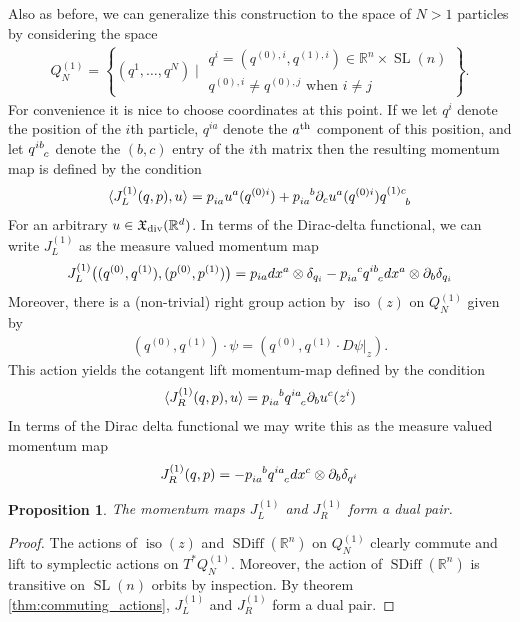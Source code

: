 \documentclass[12pt]{amsart}
\newcommand{\R}{\ensuremath{\mathbb{R}}}
\newtheorem{prop}[thm]{Proposition}
\DeclareMathOperator{\SDiff}{SDiff}
\DeclareMathOperator{\SL}{SL}
\DeclareMathOperator{\iso}{iso}
\begin{document}
  Also as before, we can generalize this construction to the space of
  $N > 1$ particles by considering the space
  \begin{align*}
    Q^{(1)}_N = \left\{  ( q^1 , \dots, q^N ) \mid
      \begin{array}{c}
        q^i = (q^{(0),i},q^{(1),i}) \in \R^n \times \SL(n) \\
        q^{(0),i} \neq q^{(0),j} \text{ when } i \neq j
      \end{array} \right\}.
  \end{align*}
  For convenience it is nice to choose coordinates at this point.
  If we let $q^i$ denote the position of the $i$th particle,
  $q^{ia}$ denote the $a^{\rm th}$ component of this position,
  and let $q\indices{^{ib}_c}$ denote the $(b,c)$ entry of the $i$th
  matrix then the resulting momentum map is defined by the condition
  \begin{align*}
    \langle J_L^{(1)}(q,p) , u \rangle = p\indices{_{ia}} u^a(q^{(0)i}) + p \indices{_{ia}^{b}} \partial_c u^a(q^{(0)i}) q\indices{^{(1)c}_b}
  \end{align*}
  For an arbitrary $u \in \mathfrak{X}_{\rm div}(\R^d)$.
  In terms of the Dirac-delta functional, we can write $J_L^{(1)}$ as the measure valued momentum map
  \begin{align*}
    J_L^{(1)}\big( (q^{(0)}, q^{(1)} ),(p^{(0)}, p^{(1)}) \big)
    = p_{ia}dx^a \otimes \delta_{q_i} - p\indices{_{ia}^c} q\indices{^{ib}_c} dx^a \otimes \partial_b \delta_{q_i}
  \end{align*}
  Moreover, there is a (non-trivial) right group action by $\iso(z)$ on $Q^{(1)}_N$ given by
  \begin{align*}
    (q^{(0)} , q^{(1)} ) \cdot \psi = (q^{(0)} , q^{(1)} \cdot D\psi|_z).
  \end{align*}
  This action yields the cotangent lift momentum-map defined by the condition
  \begin{align*}
  	\langle J_R^{(1)}(q,p) , u \rangle = p \indices{_{ia}^b} q\indices{^{ia}_c} \partial_b u^c(z^i)
  \end{align*}
  In terms of the Dirac delta functional we may write this as the measure valued momentum map
  \begin{align*}
    J_R^{(1)}( q,p) = - p\indices{_{ia}^b} q\indices{^{ia}_c}  dx^c \otimes \partial_b \delta_{q^i}
  \end{align*}
  \begin{prop}
    The momentum maps $J_L^{(1)}$ and $J_R^{(1)}$ form a dual pair.
  \end{prop}
  \begin{proof}
    The actions of $\iso(z)$ and $\SDiff(\R^n)$ on $Q_N^{(1)}$
    clearly commute
    and lift to symplectic actions on $T^*Q_N^{(1)}$.
    Moreover, the action of $\SDiff(\R^n)$ is transitive on $\SL(n)$ orbits
    by inspection.
    By theorem \ref{thm:commuting_actions}, $J_L^{(1)}$ and $J_R^{(1)}$ form a dual pair.
  \end{proof}
\end{document}
